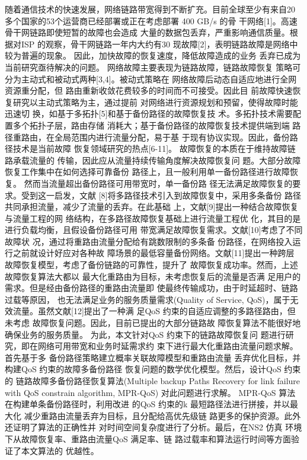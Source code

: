 随着通信技术的快速发展，网络链路带宽得到不断扩充。目前全球至少有来自20 多个国家的53个运营商已经部署或正在考虑部署 400 GB/s 的骨
干网络[1]。高速骨干网链路即使短暂的故障也会造成
大量的数据包丢弃，严重影响通信质量。根据对ISP
的观察，骨干网链路一年内大约有30%
现故障[2]，表明链路故障是网络中较为普遍的现象。
因此，加快故障的恢复速度，降低故障造成的业务
丢弃已成为当前研究亟待解决的问题。
网络故障主要表现为链路故障，链路故障恢复
策略可分为主动式和被动式两种[3,4]。被动式策略在
网络故障后动态自适应地进行全网资源重分配，但
路由重新收敛花费较多的时间而不可接受。因此目
前故障快速恢复研究以主动式策略为主，通过提前
对网络进行资源规划和预留，使得故障时能迅速切
换，如基于多拓扑[5]和基于备份路径的故障恢复技
术。多拓扑技术需要配置多个拓扑子层，路由存储
消耗大；基于备份路径的故障恢复技术提供端到端
路径重路由，在全局范围内进行流量分配，易于基
于现有协议实现。因此，备份路径技术是当前故障
恢复领域研究的热点[6-11]。
故障恢复的本质在于维持故障链路承载流量的
传输，因此应从流量持续传输角度解决故障恢复问
题。大部分故障恢复工作集中在如何选择可靠备份
路径上，且一般利用单一备份路径进行故障恢复。
然而当流量超出备份路径可用带宽时，单一备份路
径无法满足故障恢复的要求。受到这一启发，文献
[8]将多路径技术引入到故障恢复中，采用多条备份
路径共同承担流量，减少了流量的丢弃。在此基础
上，文献[9]提出一种结合故障恢复与流量工程的网
络结构，在多路径故障恢复基础上进行流量工程优
化，其目的是进行负载均衡，且假设备份路径可用
带宽满足故障恢复需求。文献[10]考虑了不同故障状
况，通过将重路由流量分配给有跳数限制的多条备
份路径，在网络投入运行之前就设计好应对各种故
障场景的最低容量备份网络。文献[11]提出一种跨层
故障恢复模型，考虑了备份链路的可靠性，提升了
故障恢复成功率。然而，上述故障恢复算法大都以
最大化重路由为目标，未考虑恢复后的流量是否满
足用户的需求。但是经由备份路径的重路由流量即
使最终传输成功，由于时延超时、链路过载等原因，
也无法满足业务的服务质量需求(Quality of Service,
QoS)，属于无效流量。虽然文献[12]提出了一种满
足QoS 约束的自适应调整的多路径路由，但未考虑
故障恢复问题。因此，目前已提出的大部分链路故
障恢复算法不能很好地确保业务的服务质量。
为此，本文针对QoS 约束下的链路故障恢复问
题进行研究，即在网络可用带宽和业务时延需求约
束下进行最大化重路由流量问题求解。首先基于多
备份路径策略建立概率关联故障模型和重路由流量
丢弃优化目标，并构建QoS 约束的故障多备份路径
恢复问题的数学优化模型。然后，设计QoS 约束的
链路故障多备份路径恢复算法(Multiple backup
Paths Recovery for link failure with QoS constrain
algorithm, MPR-QoS) 对此问题进行求解。
MPR-QoS 算法在构建单条备份路径时，利用改进
的QoS 约束的k 最短路径法进行拼接，并以最大化
减少重路由流量丢弃为目标，且分配给高优先级链
路更多的保护资源。此外还证明了算法的正确性并
对时间空间复杂度进行了分析。最后，在NS2 仿真
环境下从故障恢复率、重路由流量QoS 满足率、链
路过载率和算法运行时间等方面验证了本文算法的
优越性。


